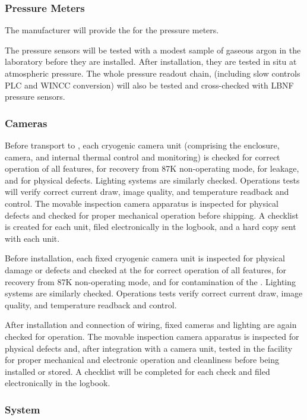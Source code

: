 \subsubsection{Pressure Meters}

The manufacturer will provide the  for the pressure meters.

The pressure sensors will be tested with a modest sample of gaseous
argon in the laboratory before they are installed. After installation,
they are tested in situ at atmospheric pressure. The whole pressure
readout chain, (including slow controls PLC and WINCC conversion) will
also be tested and cross-checked with LBNF pressure sensors.

\subsubsection{Cameras}

Before transport to , each cryogenic camera unit
(comprising the enclosure, camera, and internal thermal control and
monitoring) is checked for correct operation of all features, for
recovery from 87K non-operating mode, for leakage, and for physical
defects. Lighting systems are similarly checked. Operations tests will
verify correct current draw, image quality, and temperature readback
and control. The movable inspection camera apparatus is inspected for
physical defects and checked for proper mechanical operation before
shipping. A checklist is created for each unit, filed electronically
in the  logbook, and a hard copy sent with each unit.

Before installation, each fixed cryogenic camera unit is inspected for
physical damage or defects and checked at the  for correct
operation of all features, for recovery from 87K non-operating mode,
and for contamination of the . Lighting systems are similarly
checked. Operations tests verify correct current draw, image quality,
and temperature readback and control.

After installation and connection of wiring, fixed cameras and
lighting are again checked for operation.  The movable inspection
camera apparatus is inspected for physical defects and, after
integration with a camera unit, tested in the facility for proper
mechanical and electronic operation and cleanliness before being
installed or stored. A checklist will be completed for each  check
and filed electronically in the  logbook.

\subsubsection{ System}


